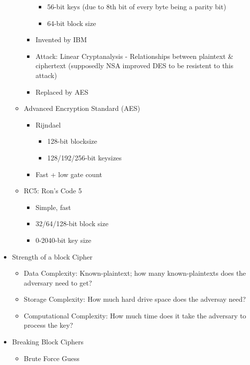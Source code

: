\begin{itemize}
\begin{itemize}
\begin{itemize}
            \begin{itemize}
            \item 56-bit keys (due to 8th bit of every byte being a parity bit)
            \item 64-bit block size
            \end{itemize}
        \item Invented by IBM
        \item Attack: Linear Cryptanalysis - Relationships between plaintext & ciphertext (supposedly NSA improved DES to be resistent to this attack)
        \item Replaced by AES
        \end{itemize}
    \item Advanced Encryption Standard (AES)
        \begin{itemize}
        \item Rijndael
            \begin{itemize}
            \item 128-bit blocksize
            \item 128/192/256-bit keysizes
            \end{itemize}
        \item Fast + low gate count
        \end{itemize}
    \item RC5: Ron's Code 5
        \begin{itemize}
        \item Simple, fast
        \item 32/64/128-bit block size
        \item 0-2040-bit key size
        \end{itemize}
    \end{itemize}
\item Strength of a block Cipher
    \begin{itemize}
    \item Data Complexity: Known-plaintext; how many known-plaintexts does the adversary need to get?
    \item Storage Complexity: How much hard drive space does the adversay need?
    \item Computational Complexity: How much time does it take the adversary to process the key?
    \end{itemize}
\item Breaking Block Ciphers
    \begin{itemize}
    \item Brute Force Guess

\end{itemize}
\end{itemize}

